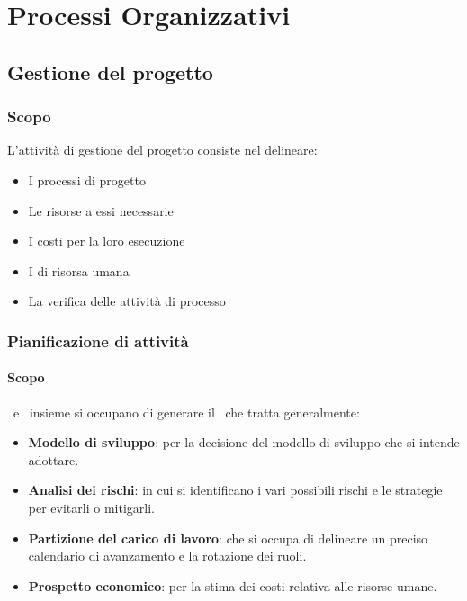 \section{Processi Organizzativi}


    \subsection{Gestione del progetto}

	    \subsubsection{Scopo}
	    L'attività di gestione del progetto consiste nel delineare:
	    \begin{itemize}
	    	\item I processi di progetto
	    	\item Le risorse a essi necessarie
	    	\item I costi per la loro esecuzione
	    	\item I  di risorsa umana
	    	\item La verifica delle attività di processo
	    \end{itemize}


		\subsubsection{Pianificazione di attività}

			\paragraph{Scopo}
			\Res\ e \Amm\ insieme si occupano di generare il \PdPv\ che tratta generalmente:
			\begin{itemize}
				\item \textbf{Modello di sviluppo}: per la decisione del modello di sviluppo che si intende adottare.
				\item \textbf{Analisi dei rischi}: in cui si identificano i vari possibili rischi e le strategie per evitarli o mitigarli.
				\item \textbf{Partizione del carico di lavoro}: che si occupa di delineare un preciso calendario di avanzamento e la rotazione dei ruoli.
				\item \textbf{Prospetto economico}: per la stima dei costi relativa alle risorse umane.
			\end{itemize}

